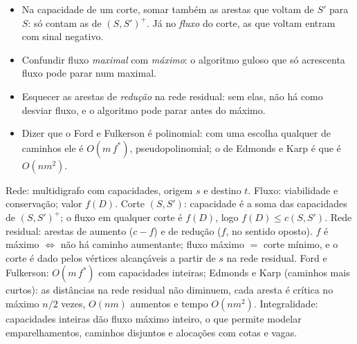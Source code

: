 \begin{cuidado}
\begin{itemize}
  \item Na capacidade de um corte, somar também as arestas que voltam de $S'$ para $S$: só contam as de $(S,S')^+$. Já no \emph{fluxo} do corte, as que voltam entram com sinal negativo.
  \item Confundir fluxo \emph{maximal} com \emph{máximo}: o algoritmo guloso que só acrescenta fluxo pode parar num maximal.
  \item Esquecer as arestas de \emph{redução} na rede residual: sem elas, não há como desviar fluxo, e o algoritmo pode parar antes do máximo.
  \item Dizer que o Ford e Fulkerson é polinomial: com uma escolha qualquer de caminhos ele é $O(m\,f^*)$, pseudopolinomial; o de Edmonds e Karp é que é $O(nm^2)$.
\end{itemize}
\end{cuidado}

\begin{chave}
Rede: multidigrafo com capacidades, origem $s$ e destino $t$. Fluxo: viabilidade e conservação; valor $f(D)$. Corte $(S,S')$: capacidade é a soma das capacidades de $(S,S')^+$; o fluxo em qualquer corte é $f(D)$, logo $f(D)\le c(S,S')$. Rede residual: arestas de aumento ($c-f$) e de redução ($f$, no sentido oposto). $f$ é máximo $\iff$ não há caminho aumentante; fluxo máximo $=$ corte mínimo, e o corte é dado pelos vértices alcançáveis a partir de $s$ na rede residual. Ford e Fulkerson: $O(m\,f^*)$ com capacidades inteiras; Edmonds e Karp (caminhos mais curtos): as distâncias na rede residual não diminuem, cada aresta é crítica no máximo $n/2$ vezes, $O(nm)$ aumentos e tempo $O(nm^2)$. Integralidade: capacidades inteiras dão fluxo máximo inteiro, o que permite modelar emparelhamentos, caminhos disjuntos e alocações com cotas e vagas.
\end{chave}

